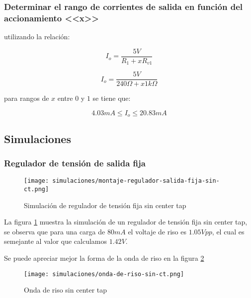 \subsubsection{Determinar el rango de corrientes de salida en función del accionamiento <<x>>}

utilizando la relación:

\begin{equation}
    I_o = \frac{5V}{R_1 + xR_{v1}}
\end{equation}

\begin{equation}
    I_o = \frac{5V}{240 \Omega + x 1k \Omega}
\end{equation}

para rangos de $x$ entre $0$ y $1$ se tiene que:

\begin{equation*}
    4.03 mA \leq I_o \leq 20.83 mA 
\end{equation*}

\subsection{Simulaciones}

\subsubsection{Regulador de tensión de salida fija}

\begin{figure}[ht]
    \centering
    \texttt{[image: simulaciones/montaje-regulador-salida-fija-sin-ct.png]}
    \caption{Simulación de regulador de tensión fija sin center tap}
    \label{fig:simulacion-regulador-tension-fija-sin-ct}
\end{figure}

La figura \ref{fig:simulacion-regulador-tension-fija-sin-ct} muestra la simulación de un regulador de tensión fija sin center tap, se observa que para una carga de $80mA$ el voltaje de riso es $1.05 Vpp$, el cual es semejante al valor que calculamos $1.42 V$.

Se puede apreciar mejor la forma de la onda de riso en la figura \ref{fig:onda-de-riso-sin-ct} 

\begin{figure}[ht]
    \centering
    \texttt{[image: simulaciones/onda-de-riso-sin-ct.png]}
    \caption{Onda de riso sin center tap}
    \label{fig:onda-de-riso-sin-ct}
\end{figure}

